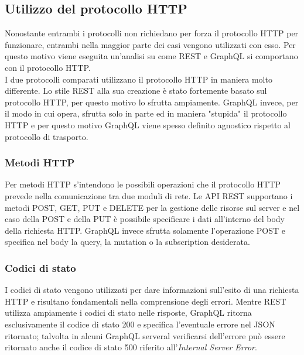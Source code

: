 \subsection{Utilizzo del protocollo HTTP}
Nonostante entrambi i protocolli non richiedano per forza il protocollo HTTP per funzionare, entrambi nella maggior parte dei casi vengono utilizzati con esso. Per questo motivo viene eseguita un'analisi su come REST e GraphQL si comportano con il protocollo HTTP. \\
I due protocolli comparati utilizzano il protocollo HTTP in maniera molto differente. Lo stile REST alla sua creazione è stato fortemente basato sul protocollo HTTP, per questo motivo lo sfrutta ampiamente. GraphQL invece, per il modo in cui opera, sfrutta solo in parte ed in maniera "stupida" il protocollo HTTP e per questo motivo GraphQL viene spesso definito agnostico rispetto al protocollo di trasporto.
\subsubsection*{Metodi HTTP}
Per metodi HTTP s'intendono le possibili operazioni che il protocollo HTTP prevede nella comunicazione tra due moduli di rete. Le API REST supportano i metodi POST, GET, PUT e DELETE per la gestione delle risorse sul server e nel caso della POST e della PUT è possibile specificare i dati all'interno del body della richiesta HTTP. GraphQL invece sfrutta solamente l'operazione POST e specifica nel body la query, la mutation o la subscription desiderata.
\subsubsection*{Codici di stato}
I codici di stato vengono utilizzati per dare informazioni sull'esito di una richiesta HTTP e risultano fondamentali nella comprensione degli errori. Mentre REST utilizza ampiamente i codici di stato nelle risposte, GraphQL ritorna esclusivamente il codice di stato 200 e specifica l'eventuale errore nel JSON ritornato; talvolta in alcuni GraphQL serveral verificarsi dell'errore può essere ritornato anche il codice di stato 500 riferito all'\textit{Internal Server Error}.
